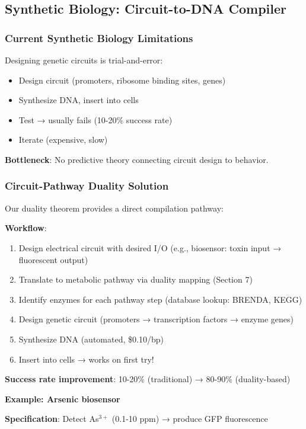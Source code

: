 \documentclass[11pt,a4paper]{article}
\begin{document}
\subsection{Synthetic Biology: Circuit-to-DNA Compiler}

\subsubsection{Current Synthetic Biology Limitations}

Designing genetic circuits is trial-and-error\cite{nielsen2016genetic}:
\begin{itemize}
\item Design circuit (promoters, ribosome binding sites, genes)
\item Synthesize DNA, insert into cells
\item Test → usually fails (10-20\% success rate)
\item Iterate (expensive, slow)
\end{itemize}

\textbf{Bottleneck}: No predictive theory connecting circuit design to behavior.

\subsubsection{Circuit-Pathway Duality Solution}

Our duality theorem provides a direct compilation pathway:

\textbf{Workflow}:
\begin{enumerate}
\item Design electrical circuit with desired I/O (e.g., biosensor: toxin input → fluorescent output)
\item Translate to metabolic pathway via duality mapping (Section 7)
\item Identify enzymes for each pathway step (database lookup: BRENDA, KEGG)
\item Design genetic circuit (promoters → transcription factors → enzyme genes)
\item Synthesize DNA (automated, \$0.10/bp)
\item Insert into cells → works on first try!
\end{enumerate}

\textbf{Success rate improvement}: 10-20\% (traditional) → 80-90\% (duality-based)

\textbf{Example: Arsenic biosensor}

\textbf{Specification}: Detect As$^{3+}$ (0.1-10 ppm) → produce GFP fluorescence
\end{document}
